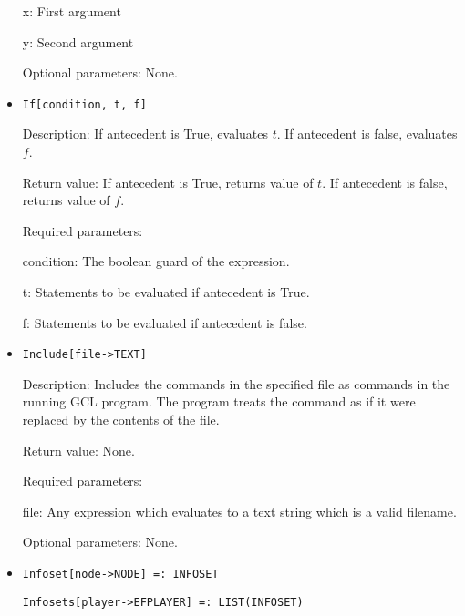 \begin{itemize}
\bd
\item
[x:] First argument
\item
[y:] Second argument
\ed
\item
[Optional parameters:] None.
\ed



\item 
\protect \large \begin{verbatim}
If[condition, t, f]
\end{verbatim} \normalsize
  
\bd
\item
[Description:] If antecedent is True, evaluates $t$.  If
antecedent is false, evaluates $f$. 
\item
[Return value:] If antecedent is True, returns value of $t$.  If
antecedent is false, returns value of $f$.  
\item
[Required parameters:]\hfil\null
\bd
\item
[condition:] The boolean guard of the expression.
\item
[t:] Statements to be evaluated if antecedent is True. 
\item
[f:] Statements to be evaluated if antecedent is false. 
\ed
\ed


\item
\protect \large \begin{verbatim}
Include[file->TEXT]
\end{verbatim}\normalsize

\bd
\item
[Description:] Includes the commands in the specified file as commands
in the running GCL program.  The program treats the command as if it
were replaced by the contents of the file.
\item
[Return value:] None.
\item
[Required parameters:]\hfil\null
	
\bd
\item
[file:] Any expression which evaluates to a text string which is a
valid filename.
\ed

\item
[Optional parameters:] None.\hfil\null
\ed

\item
\protect \large \begin{verbatim}
Infoset[node->NODE] =: INFOSET
\end{verbatim}\normalsize

\protect \large \begin{verbatim}
Infosets[player->EFPLAYER] =: LIST(INFOSET)
\end{verbatim}\normalsize


\end{itemize}
